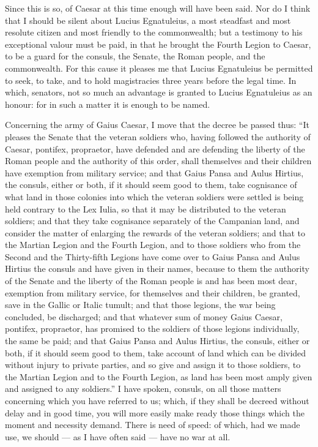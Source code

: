  Since this is so, of Caesar at this time enough will have been said. Nor do I think that I should be silent about Lucius Egnatuleius, a most steadfast and most resolute citizen and most friendly to the commonwealth; but a testimony to his exceptional valour must be paid, in that he brought the Fourth Legion to Caesar, to be a guard for the consuls, the Senate, the Roman people, and the commonwealth. For this cause it pleases me that Lucius Egnatuleius be permitted to seek, to take, and to hold magistracies three years before the legal time. In which, senators, not so much an advantage is granted to Lucius Egnatuleius as an honour: for in such a matter it is enough to be named.

 Concerning the army of Gaius Caesar, I move that the decree be passed thus: ``It pleases the Senate that the veteran soldiers who, having followed the authority of Caesar, pontifex, propraetor, have defended and are defending the liberty of the Roman people and the authority of this order, shall themselves and their children have exemption from military service; and that Gaius Pansa and Aulus Hirtius, the consuls, either or both, if it should seem good to them, take cognisance of what land in those colonies into which the veteran soldiers were settled is being held contrary to the Lex Iulia, so that it may be distributed to the veteran soldiers; and that they take cognisance separately of the Campanian land, and consider the matter of enlarging the rewards of the veteran soldiers; and that to the Martian Legion and the Fourth Legion, and to those soldiers who from the Second and the Thirty-fifth Legions have come over to Gaius Pansa and Aulus Hirtius the consuls and have given in their names, because to them the authority of the Senate and the liberty of the Roman people is and has been most dear, exemption from military service, for themselves and their children, be granted, save in the Gallic or Italic tumult; and that those legions, the war being concluded, be discharged; and that whatever sum of money Gaius Caesar, pontifex, propraetor, has promised to the soldiers of those legions individually, the same be paid; and that Gaius Pansa and Aulus Hirtius, the consuls, either or both, if it should seem good to them, take account of land which can be divided without injury to private parties, and so give and assign it to those soldiers, to the Martian Legion and to the Fourth Legion, as land has been most amply given and assigned to any soldiers.'' I have spoken, consuls, on all those matters concerning which you have referred to us; which, if they shall be decreed without delay and in good time, you will more easily make ready those things which the moment and necessity demand. There is need of speed: of which, had we made use, we should --- as I have often said --- have no war at all.
